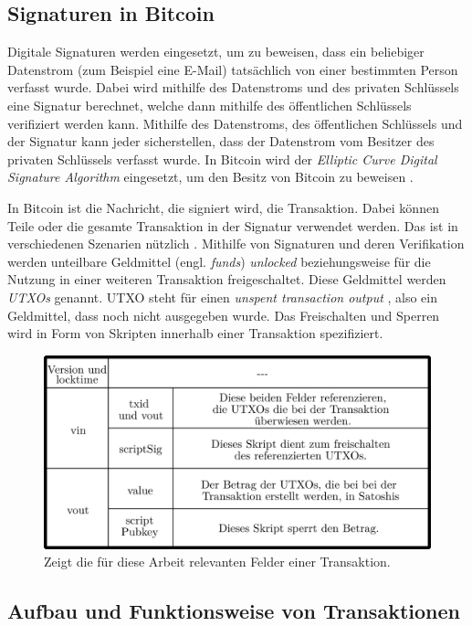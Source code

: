 \documentclass[ngerman,runningheads,a4paper]{llncs}[2018/03/10]
\begin{document}
\subsection{Signaturen in Bitcoin}

Digitale Signaturen werden eingesetzt, um zu beweisen, dass ein beliebiger Datenstrom (zum Beispiel eine E-Mail) tatsächlich von einer bestimmten Person verfasst wurde. Dabei wird mithilfe des Datenstroms und des privaten Schlüssels eine Signatur berechnet, welche dann mithilfe des öffentlichen Schlüssels verifiziert werden kann. Mithilfe des Datenstroms, des öffentlichen Schlüssels und der Signatur kann jeder sicherstellen, dass der Datenstrom vom Besitzer des privaten Schlüssels verfasst wurde. In Bitcoin wird der \textit{Elliptic Curve Digital Signature Algorithm} eingesetzt, um den Besitz von Bitcoin zu beweisen \citep{bitcoinbook}.

In Bitcoin ist die Nachricht, die signiert wird, die Transaktion. Dabei können Teile oder die gesamte Transaktion in der Signatur verwendet werden. Das ist in verschiedenen Szenarien nützlich \citep{bitcoinbook}. Mithilfe von Signaturen und deren Verifikation werden unteilbare Geldmittel (engl. \textit{funds}) \textit{unlocked} beziehungsweise für die Nutzung in einer weiteren Transaktion freigeschaltet. Diese Geldmittel werden \textit{UTXOs} genannt. UTXO steht für einen \textit{unspent transaction output} \citep{bitcoinbook}, also ein Geldmittel, dass noch nicht ausgegeben wurde. Das Freischalten und Sperren wird in Form von Skripten innerhalb einer Transaktion spezifiziert.

\begin{figure}
  \centering
  \includegraphics[width=.8\textwidth]{grafiken/tableTransaction.png}
  \caption{Zeigt die für diese Arbeit relevanten Felder einer Transaktion.}
  \label{fig:transactionTable}
\end{figure}

\subsection{Aufbau und Funktionsweise von Transaktionen}
\end{document}
